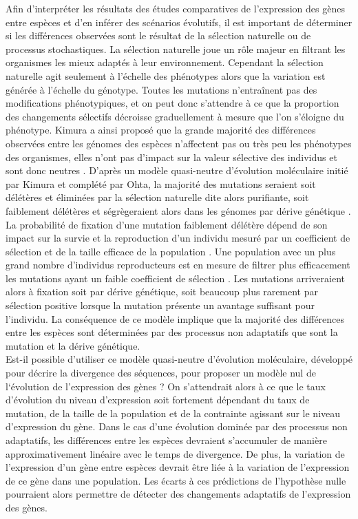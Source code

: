 Afin d’interpréter les résultats des études comparatives de l’expression des gènes entre espèces et d’en inférer des scénarios évolutifs, il est important de déterminer si les différences observées sont le résultat de la sélection naturelle ou de processus stochastiques. La sélection naturelle joue un rôle majeur en filtrant les organismes les mieux adaptés à leur environnement. Cependant la sélection naturelle agit seulement à l’échelle des phénotypes alors que la variation est générée à l’échelle du génotype. Toutes les mutations n'entraînent pas des modifications phénotypiques, et on peut donc s’attendre à ce que la proportion des changements sélectifs décroisse graduellement à mesure que l’on s’éloigne du phénotype. Kimura a ainsi proposé que la grande majorité des différences observées entre les génomes des espèces n’affectent pas ou très peu les phénotypes des organismes, elles n’ont pas d’impact sur la valeur sélective des individus et sont donc neutres \citep{kimura_neutral_1983}. D’après un modèle quasi-neutre d’évolution moléculaire initié par Kimura et complété par Ohta, la majorité des mutations seraient soit délétères et éliminées par la sélection naturelle dite alors purifiante, soit faiblement délétères et ségrègeraient alors dans les génomes par dérive génétique \citep{ohta_synonymous_1995}. La probabilité de fixation d’une mutation faiblement délétère dépend de son impact sur la survie et la reproduction d’un individu mesuré par un coefficient de sélection et de la taille efficace de la population \citep{charlesworth_effective_2009}. Une population avec un plus grand nombre d’individus reproducteurs est en mesure de filtrer plus efficacement les mutations ayant un faible coefficient de sélection \citep{ohta_slightly_1973}. Les mutations arriveraient alors à fixation soit par dérive génétique, soit beaucoup plus rarement par sélection positive lorsque la mutation présente un avantage suffisant pour l’individu. La conséquence de ce modèle implique que la majorité des différences entre les espèces sont déterminées par des processus non adaptatifs que sont la mutation et la dérive génétique. \\

Est-il possible d’utiliser ce modèle quasi-neutre d’évolution moléculaire, développé pour décrire la divergence des séquences, pour proposer un modèle nul de l‘évolution de l’expression des gènes ? On s'attendrait alors à ce que le taux d’évolution du niveau d’expression soit fortement dépendant du taux de mutation, de la taille de la population et de la contrainte agissant sur le niveau d’expression du gène. Dans le cas d’une évolution dominée par des processus non adaptatifs, les différences entre les espèces devraient s’accumuler de manière approximativement linéaire avec le temps de divergence. De plus, la variation de l’expression d’un gène entre espèces devrait être liée à la variation de l’expression de ce gène dans une population. Les écarts à ces prédictions de l’hypothèse nulle pourraient alors permettre de détecter des changements adaptatifs de l’expression des gènes.\\

